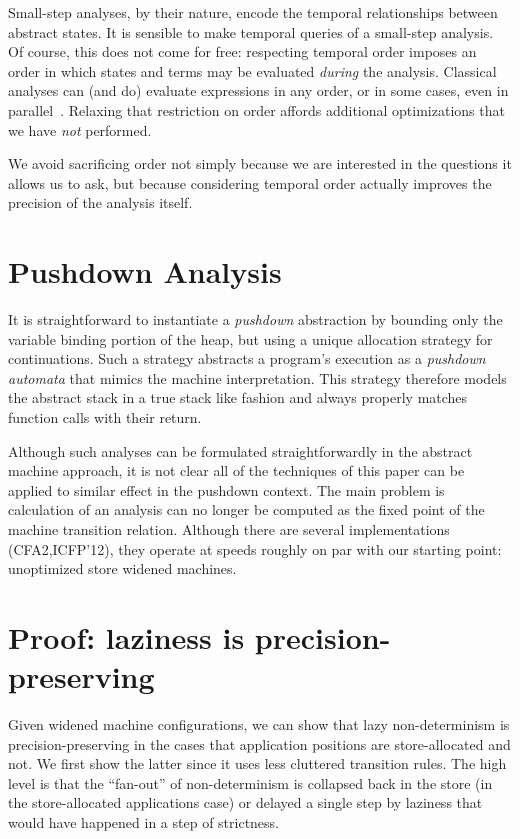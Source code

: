\documentclass[preprint,onecolumn,9pt]{sigplanconf} %
\begin{document}
Small-step analyses, by their nature, encode the temporal relationships between
abstract states.
%
It is sensible to make temporal queries of a small-step analysis.
%
Of course, this does not come for free: respecting temporal order imposes an
order in which states and terms may be evaluated \emph{during} the analysis.
%
Classical analyses can (and do) evaluate expressions in any order, or in some
cases, even in parallel~\cite{might:Prabhu:2010:EigenCFA}.
%
Relaxing that restriction on order affords additional optimizations that we
have \emph{not} performed.

We avoid sacrificing order not simply because we are interested in the
questions it allows us to ask, but because considering temporal order actually
improves the precision of the analysis itself.



\section{Pushdown Analysis}

It is straightforward to instantiate a \emph{pushdown} abstraction by
bounding only the variable binding portion of the heap, but using a
unique allocation strategy for continuations.  Such a strategy
abstracts a program's execution as a \emph{pushdown automata}
that mimics the machine interpretation.  This strategy therefore
models the abstract stack in a true stack like fashion and always
properly matches function calls with their return.

Although such analyses can be formulated straightforwardly in the
abstract machine approach, it is not clear all of the techniques of
this paper can be applied to similar effect in the pushdown context.
The main problem is calculation of an analysis can no longer be
computed as the fixed point of the machine transition relation.
Although there are several implementations (CFA2,ICFP'12), they
operate at speeds roughly on par with our starting point: unoptimized
store widened
machines. \cite{dvanhorn:Earl2012Introspective,dvanhorn:Vardoulakis2011CFA2}

\appendix
\section{Proof: laziness is precision-preserving}
Given widened machine configurations, we can show that lazy
non-determinism is precision-preserving in the cases that application
positions are store-allocated and not. We first show the latter since
it uses less cluttered transition rules. The high level is that the
``fan-out'' of non-determinism is collapsed back in the store (in the
store-allocated applications case) or delayed a single step by
laziness that would have happened in a step of strictness.
\end{document}
